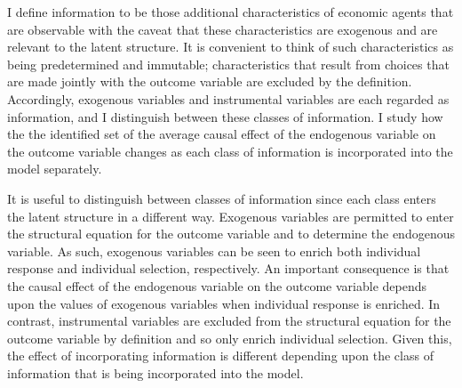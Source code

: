 \documentclass[12pt,a4paper,twoside]{article}
\numberwithin{equation}{section}
\begin{document}
I define information to be those additional characteristics of economic agents that are observable with the caveat that these characteristics are exogenous and are relevant to the latent structure. It is convenient to think of such characteristics as being predetermined and immutable; characteristics that result from choices that are made jointly with the outcome variable are excluded by the definition. Accordingly, exogenous variables and instrumental variables are each regarded as information, and I distinguish between these classes of information. I study how the the identified set of the average causal effect of the endogenous variable on the outcome variable changes as each class of information is incorporated into the model separately. 

It is useful to distinguish between classes of information since each class enters the latent structure in a different way. Exogenous variables are permitted to enter the structural equation for the outcome variable and to determine the endogenous variable. As such, exogenous variables can be seen to enrich both individual response and individual selection, respectively. An important consequence is that the causal effect of the endogenous variable on the outcome variable depends upon the values of exogenous variables when individual response is enriched. In contrast, instrumental variables are excluded from the structural equation for the outcome variable by definition and so only enrich individual selection. Given this, the effect of incorporating information is different depending upon the class of information that is being incorporated into the model.  
\end{document}
